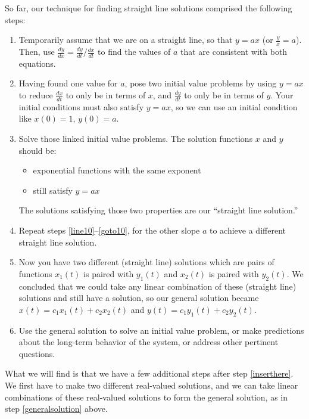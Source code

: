 \clearpage
So far, our technique for finding straight line solutions comprised the following steps:
\begin{enumerate}
\item Temporarily assume that we are on a straight line, so that $y=ax$ (or $\frac yx=a$).  Then, use $\frac{dy}{dx} = \frac{dy}{dt} / \frac{dx}{dt}$ to find the values of $a$ that are consistent with both equations.  
\item\label{line10} Having found one value for $a$, pose two initial value problems by using $y=ax$ to reduce $\frac{dx}{dt}$ to only be in terms of $x$, and $\frac{dy}{dt}$ to only be in terms of $y$.  Your initial conditions must also satisfy $y=ax$, so we can use an initial condition like $x(0)=1$, $y(0)=a$.
\item\label{goto10}Solve those linked initial value problems.  The solution functions $x$ and $y$ should be:
\begin{itemize}
\item exponential functions with the same exponent
\item still satisfy $y=ax$
\end{itemize}
The solutions satisfying those two properties are our ``straight line solution.'' 
\item\label{inserthere} Repeat steps \ref{line10}--\ref{goto10}, for the other slope $a$ to achieve a different straight line solution.
\item\label{generalsolution} Now you have two different (straight line) solutions which are pairs of functions $x_1(t)$ is paired with $y_1(t)$ and $x_2(t)$ is paired with $y_2(t)$.  We concluded that we could take any linear combination of these (straight line) solutions and still have a solution, so our general solution became $x(t)=c_1 x_1(t) + c_2 x_2(t)$ and $y(t) = c_1 y_1(t) + c_2 y_2(t)$.   
\item Use the general solution to solve an initial value problem, or make predictions about the long-term behavior of the system, or address other pertinent questions.

\end{enumerate}
What we will find is that we have a few additional steps after step \ref{inserthere}.  We first have to make two different real-valued solutions, and we can take linear combinations of these real-valued solutions to form the general solution, as in step \ref{generalsolution} above.

